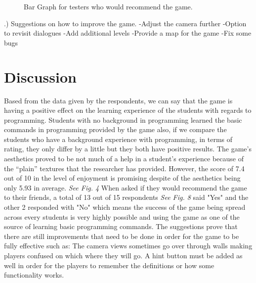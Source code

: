 \documentclass[journal]{./IEEE/IEEEtran}
\newcommand{\tab} [1][0.5cm]{\hspace*{#1}}
\begin{document}
\begin{justify}
\begin{figure}[ht]
   \caption{Bar Graph for testers who would recommend the game.}
   \label{3}
\end{figure}
.) Suggestions on how to improve the game.\newline
-Adjust the camera further \newline
-Option to revisit dialogues \newline
-Add additional levels \newline
-Provide a map for the game \newline
-Fix some bugs

\section{\textbf{Discussion}}
Based from the data given by the respondents, we can say that the game is having a positive effect on the learning experience of the students with regards to programming. Students with no background in programming learned the basic commands in programming provided by the game also, if we compare the students who have a background experience with programming, in terms of rating, they only differ by a little but they both have positive results.\newline
\tab	The game’s aesthetics proved to be not much of a help in a student’s experience because of the “plain” textures that the researcher has provided. However, the score of 7.4 out of 10 in the level of enjoyment is promising despite of the aesthetics being only 5.93 in average. \textit{See Fig. 4}
	When asked if they would recommend the game to their friends, a total of 13 out of 15 respondents \textit{See Fig. 8} said "Yes" and the other 2 responded with "No" which means the success of the game being spread across every students is very highly possible and using the game as one of the source of learning basic programming commands. \newline
\tab	The suggestions prove that there are still improvements that need to be done in order for the game to be fully effective such as: The camera views sometimes go over through walls making players confused on which where they will go. A hint button must be added as well in order for the players to remember the definitions or how some functionality works.



\end{justify}
\end{document}
